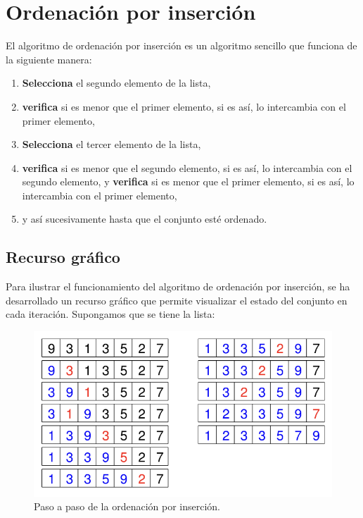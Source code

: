 \section{Ordenación por inserción}
El algoritmo de ordenación por inserción es un algoritmo sencillo que funciona de la siguiente manera:
\begin{enumerate}
    \item \textbf{Selecciona} el segundo elemento de la lista,
    \item \textbf{verifica} si es menor que el primer elemento, si es así, lo intercambia con el primer elemento,
    \item \textbf{Selecciona} el tercer elemento de la lista,
    \item \textbf{verifica} si es menor que el segundo elemento, si es así, lo intercambia con el segundo elemento, y \textbf{verifica} si es menor que el primer elemento, si es así, lo intercambia con el primer elemento,
    \item y así sucesivamente hasta que el conjunto esté ordenado.
\end{enumerate}

\subsection{Recurso gráfico}
Para ilustrar el funcionamiento del algoritmo de ordenación por inserción, se ha desarrollado un recurso gráfico que permite visualizar el estado del conjunto en cada iteración. Supongamos que se tiene la lista:
\begin{equation*}
    [ \ 9,3,1,3,5,27 \ ]
\end{equation*}

\begin{figure}[H]
    \centering
    \includegraphics[scale=0.5]{./Images/oedei.png}
    \caption{Paso a paso de la ordenación por inserción.}
\end{figure}

